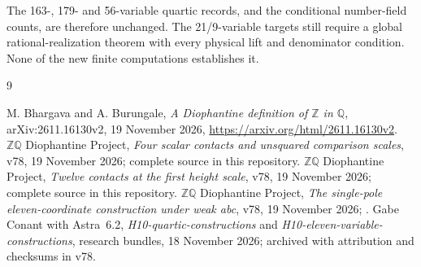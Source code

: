 \documentclass[11pt]{article}
\newcommand{\Q}{\mathbb Q}\newcommand{\Z}{\mathbb Z}
\begin{document}
The 163-, 179- and 56-variable quartic records, and the conditional
number-field counts, are therefore unchanged. The 21/9-variable targets
still require a global rational-realization theorem with every physical
lift and denominator condition. None of the new finite computations
establishes it.

\begin{thebibliography}{9}\raggedright
{} M. Bhargava and A. Burungale,
\emph{A Diophantine definition of $\Z$ in $\Q$},
arXiv:2611.16130v2, 19 November 2026,
\url{https://arxiv.org/html/2611.16130v2}.
 $\Z\Q$ Diophantine Project,
\emph{Four scalar contacts and unsquared comparison scales}, v78,
19 November 2026; complete source in this repository.
 $\Z\Q$ Diophantine Project,
\emph{Twelve contacts at the first height scale}, v78,
19 November 2026; complete source in this repository.
 $\Z\Q$ Diophantine Project,
\emph{The single-pole eleven-coordinate construction under weak abc},
v78, 19 November 2026;
.
 Gabe Conant with Astra~6.2,
\emph{H10-quartic-constructions} and
\emph{H10-eleven-variable-constructions}, research bundles,
18 November 2026; archived with attribution and checksums in v78.
\end{thebibliography}
\end{document}
